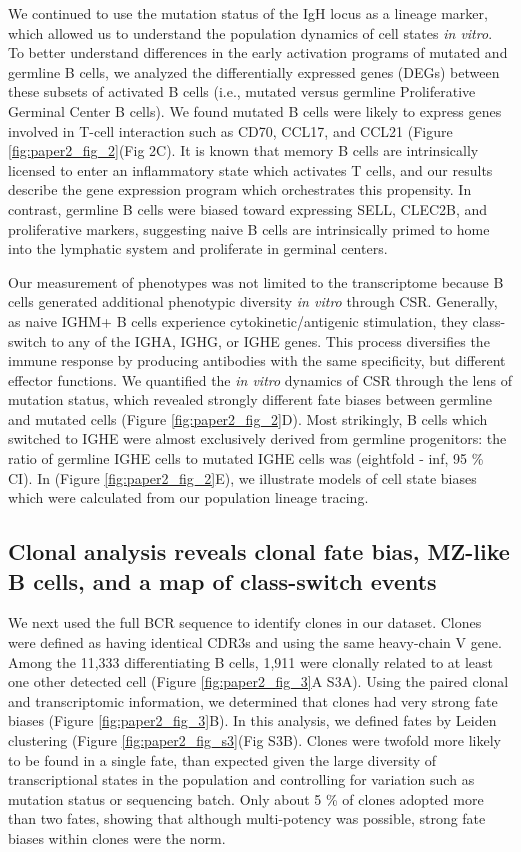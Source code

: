 We continued to use the mutation status of the IgH locus as a lineage marker, which allowed us to understand the population dynamics of cell states \textit{in vitro}. To better understand differences in the early activation programs of mutated and germline B cells, we analyzed the differentially expressed genes (DEGs) between these subsets of activated B cells (i.e., mutated versus germline Proliferative Germinal Center B cells). We found mutated B cells were likely to express genes involved in T-cell interaction such as CD70, CCL17, and CCL21 (Figure \ref{fig:paper2_fig_2}(Fig 2C). It is known that memory B cells are intrinsically licensed to enter an inflammatory state which activates T cells\cite{liu_memory_1995, good_resting_2009}, and our results describe the gene expression program which orchestrates this propensity. In contrast, germline B cells were biased toward expressing SELL, CLEC2B, and proliferative markers, suggesting naive B cells are intrinsically primed to home into the lymphatic system and proliferate in germinal centers.

Our measurement of phenotypes was not limited to the transcriptome because B cells generated additional phenotypic diversity \textit{in vitro} through CSR. Generally, as naive IGHM+ B cells experience cytokinetic/antigenic stimulation, they class-switch to any of the IGHA, IGHG, or IGHE genes. This process diversifies the immune response by producing antibodies with the same specificity, but different effector functions. We quantified the \textit{in vitro} dynamics of CSR through the lens of mutation status, which revealed strongly different fate biases between germline and mutated cells (Figure \ref{fig:paper2_fig_2}D). Most strikingly, B cells which switched to IGHE were almost exclusively derived from germline progenitors: the ratio of germline IGHE cells to mutated IGHE cells was (eightfold - inf, 95 \% CI). In  (Figure \ref{fig:paper2_fig_2}E), we illustrate models of cell state biases which were calculated from our population lineage tracing.

\subsection{Clonal analysis reveals clonal fate bias, MZ-like B cells, and a map of class-switch events
}
We next used the full BCR sequence to identify clones in our dataset. Clones were defined as having identical CDR3s and using the same heavy-chain V gene. Among the 11,333 differentiating B cells, 1,911 were clonally related to at least one other detected cell (Figure \ref{fig:paper2_fig_3}A S3A). Using the paired clonal and transcriptomic information, we determined that clones had very strong fate biases (Figure \ref{fig:paper2_fig_3}B). In this analysis, we defined fates by Leiden clustering (Figure \ref{fig:paper2_fig_s3}(Fig S3B). Clones were twofold more likely to be found in a single fate, than expected given the large diversity of transcriptional states in the population and controlling for variation such as mutation status or sequencing batch. Only about 5 \% of clones adopted more than two fates, showing that although multi-potency was possible, strong fate biases within clones were the norm.

